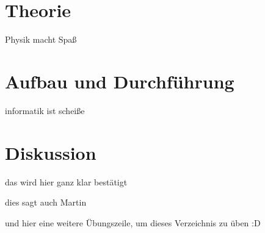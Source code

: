 \documentclass[bibliography=totoc]{scrartcl}
\begin{document}
\section{Theorie}

Physik macht Spaß \cite[1--3]{deGennes}

\section{Aufbau und Durchführung}

informatik ist scheiße \cite[10]{magnet}

\section{Diskussion}

das wird hier ganz klar bestätigt \cite[20--21]{kent}

dies sagt auch Martin\cite[5]{martin}

und hier eine weitere Übungszeile, um dieses Verzeichnis zu üben :D \cite{magnet}

\printbibliography
\end{document}
